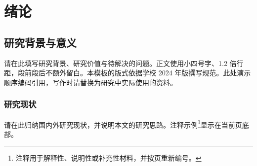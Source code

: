 \chapter{绪论}
\section{研究背景与意义}
请在此填写研究背景、研究价值与待解决的问题。正文使用小四号字、1.2 倍行距，段前段后不额外留白。本模板的版式依据学校 2024 年版撰写规范。此处演示顺序编码引用，写作时请替换为研究中实际使用的资料。

\subsection{研究现状}
请在此归纳国内外研究现状，并说明本文的研究思路。注释示例\footnote{注释用于解释性、说明性或补充性材料，并按页重新编号。}显示在当前页底部。
